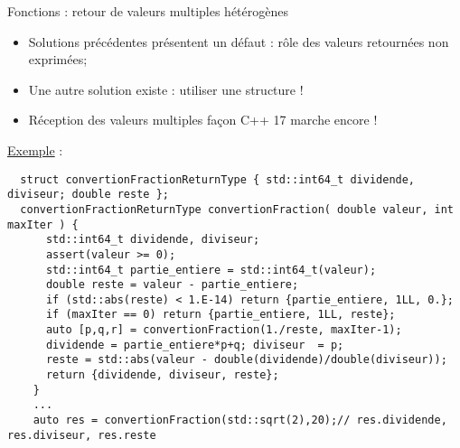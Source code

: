 \documentclass[compress,10pt,aspectratio=169]{beamer}
\begin{document}
  \begin{frame}[fragile]{Fonctions : retour de valeurs multiples hétérogènes}
    \scriptsize
  
    \begin{itemize}
  \item Solutions précédentes présentent un défaut : rôle des valeurs retournées non exprimées;
  \item Une autre solution existe : utiliser une structure !
  \item Réception des valeurs multiples façon C++ 17 marche encore !
    \end{itemize}
  
    \underline{\textcolor{NavyBlue}{Exemple}} :
    \begin{verbatim}
  struct convertionFractionReturnType { std::int64_t dividende, diviseur; double reste };
  convertionFractionReturnType convertionFraction( double valeur, int maxIter ) {
      std::int64_t dividende, diviseur;
      assert(valeur >= 0);
      std::int64_t partie_entiere = std::int64_t(valeur);
      double reste = valeur - partie_entiere;
      if (std::abs(reste) < 1.E-14) return {partie_entiere, 1LL, 0.};
      if (maxIter == 0) return {partie_entiere, 1LL, reste};
      auto [p,q,r] = convertionFraction(1./reste, maxIter-1);
      dividende = partie_entiere*p+q; diviseur  = p;
      reste = std::abs(valeur - double(dividende)/double(diviseur));
      return {dividende, diviseur, reste};
    }
    ... 
    auto res = convertionFraction(std::sqrt(2),20);// res.dividende, res.diviseur, res.reste
    \end{verbatim}
    \end{frame}
  
\end{document}
